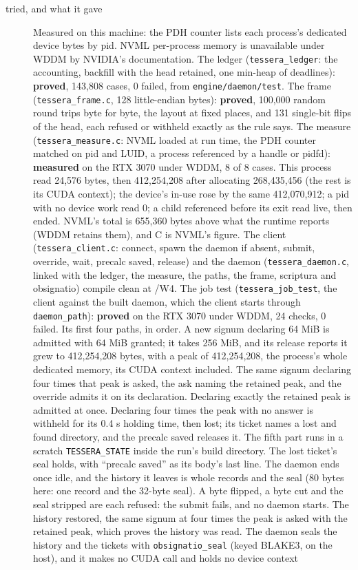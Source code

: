 \begin{description}
\item[{tried, and what it gave}] Measured on this machine: the PDH counter lists each process's dedicated device bytes by pid. NVML per-process memory is unavailable under WDDM by NVIDIA's documentation. The ledger (\texttt{tessera\_\allowbreak{}ledger}: the accounting, backfill with the head retained, one min-heap of deadlines): \textbf{proved}, 143,808 cases, 0 failed, from \texttt{engine/\allowbreak{}daemon/\allowbreak{}test}. The frame (\texttt{tessera\_\allowbreak{}frame.\allowbreak{}c}, 128 little-endian bytes): \textbf{proved}, 100,000 random round trips byte for byte, the layout at fixed places, and 131 single-bit flips of the head, each refused or withheld exactly as the rule says. The measure (\texttt{tessera\_\allowbreak{}measure.\allowbreak{}c}: NVML loaded at run time, the PDH counter matched on pid and LUID, a process referenced by a handle or pidfd): \textbf{measured} on the RTX 3070 under WDDM, 8 of 8 cases. This process read 24,576 bytes, then 412,254,208 after allocating 268,435,456 (the rest is its CUDA context); the device's in-use rose by the same 412,070,912; a pid with no device work read 0; a child referenced before its exit read live, then ended. NVML's total is 655,360 bytes above what the runtime reports (WDDM retains them), and C is NVML's figure. The client (\texttt{tessera\_\allowbreak{}client.\allowbreak{}c}: connect, spawn the daemon if absent, submit, override, wait, precalc saved, release) and the daemon (\texttt{tessera\_\allowbreak{}daemon.\allowbreak{}c}, linked with the ledger, the measure, the paths, the frame, scriptura and obsignatio) compile clean at /W4. The job test (\texttt{tessera\_\allowbreak{}job\_\allowbreak{}test}, the client against the built daemon, which the client starts through \texttt{daemon\_\allowbreak{}path}): \textbf{proved} on the RTX 3070 under WDDM, 24 checks, 0 failed. Its first four paths, in order. A new signum declaring 64 MiB is admitted with 64 MiB granted; it takes 256 MiB, and its release reports it grew to 412,254,208 bytes, with a peak of 412,254,208, the process's whole dedicated memory, its CUDA context included. The same signum declaring four times that peak is asked, the ask naming the retained peak, and the override admits it on its declaration. Declaring exactly the retained peak is admitted at once. Declaring four times the peak with no answer is withheld for its 0.4 s holding time, then lost; its ticket names a lost and found directory, and the precalc saved releases it. The fifth part runs in a scratch \texttt{TESSERA\_\allowbreak{}STATE} inside the run's build directory. The lost ticket's seal holds, with “precalc saved” as its body's last line. The daemon ends once idle, and the history it leaves is whole records and the seal (80 bytes here: one record and the 32-byte seal). A byte flipped, a byte cut and the seal stripped are each refused: the submit fails, and no daemon starts. The history restored, the same signum at four times the peak is asked with the retained peak, which proves the history was read. The daemon seals the history and the tickets with \texttt{obsignatio\_\allowbreak{}seal} (keyed BLAKE3, on the host), and it makes no CUDA call and holds no device context 
\end{description}
